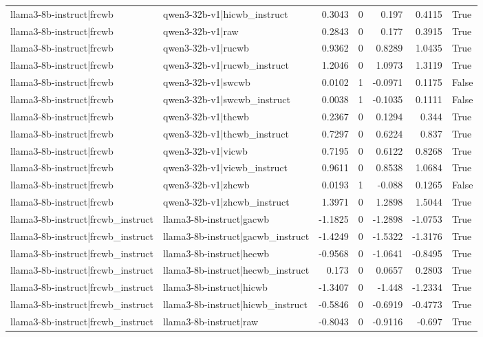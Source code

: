 \begin{table}
\begin{tabular}{l l r r r r l}
llama3-8b-instruct|frcwb & qwen3-32b-v1|hicwb_instruct & 0.3043 & 0 & 0.197 & 0.4115 & True \\
llama3-8b-instruct|frcwb & qwen3-32b-v1|raw & 0.2843 & 0 & 0.177 & 0.3915 & True \\
llama3-8b-instruct|frcwb & qwen3-32b-v1|rucwb & 0.9362 & 0 & 0.8289 & 1.0435 & True \\
llama3-8b-instruct|frcwb & qwen3-32b-v1|rucwb_instruct & 1.2046 & 0 & 1.0973 & 1.3119 & True \\
llama3-8b-instruct|frcwb & qwen3-32b-v1|swcwb & 0.0102 & 1 & -0.0971 & 0.1175 & False \\
llama3-8b-instruct|frcwb & qwen3-32b-v1|swcwb_instruct & 0.0038 & 1 & -0.1035 & 0.1111 & False \\
llama3-8b-instruct|frcwb & qwen3-32b-v1|thcwb & 0.2367 & 0 & 0.1294 & 0.344 & True \\
llama3-8b-instruct|frcwb & qwen3-32b-v1|thcwb_instruct & 0.7297 & 0 & 0.6224 & 0.837 & True \\
llama3-8b-instruct|frcwb & qwen3-32b-v1|vicwb & 0.7195 & 0 & 0.6122 & 0.8268 & True \\
llama3-8b-instruct|frcwb & qwen3-32b-v1|vicwb_instruct & 0.9611 & 0 & 0.8538 & 1.0684 & True \\
llama3-8b-instruct|frcwb & qwen3-32b-v1|zhcwb & 0.0193 & 1 & -0.088 & 0.1265 & False \\
llama3-8b-instruct|frcwb & qwen3-32b-v1|zhcwb_instruct & 1.3971 & 0 & 1.2898 & 1.5044 & True \\
llama3-8b-instruct|frcwb_instruct & llama3-8b-instruct|gacwb & -1.1825 & 0 & -1.2898 & -1.0753 & True \\
llama3-8b-instruct|frcwb_instruct & llama3-8b-instruct|gacwb_instruct & -1.4249 & 0 & -1.5322 & -1.3176 & True \\
llama3-8b-instruct|frcwb_instruct & llama3-8b-instruct|hecwb & -0.9568 & 0 & -1.0641 & -0.8495 & True \\
llama3-8b-instruct|frcwb_instruct & llama3-8b-instruct|hecwb_instruct & 0.173 & 0 & 0.0657 & 0.2803 & True \\
llama3-8b-instruct|frcwb_instruct & llama3-8b-instruct|hicwb & -1.3407 & 0 & -1.448 & -1.2334 & True \\
llama3-8b-instruct|frcwb_instruct & llama3-8b-instruct|hicwb_instruct & -0.5846 & 0 & -0.6919 & -0.4773 & True \\
llama3-8b-instruct|frcwb_instruct & llama3-8b-instruct|raw & -0.8043 & 0 & -0.9116 & -0.697 & True \\

\end{tabular}
\end{table}
